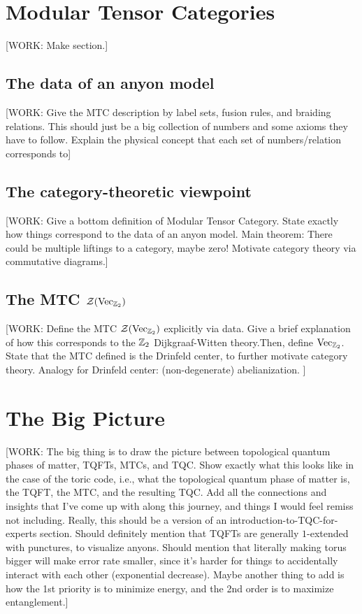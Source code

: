 \documentclass{article}
\theoremstyle{definition}
\numberwithin{figure}{section}
\begin{document}
\section{Modular Tensor Categories}
\label{Modular Tensor Categories}

[WORK: Make section.]
\subsection{The data of an anyon model}
\label{Anyon model}

[WORK: Give the MTC description by label sets, fusion rules, and braiding relations. This should just be a big collection of numbers and some axioms they have to follow. Explain the physical concept that each set of numbers/relation corresponds to]

\subsection{The category-theoretic viewpoint}
\label{Category viewpoint}

[WORK: Give a bottom definition of Modular Tensor Category. State exactly how things correspond to the data of an anyon model. Main theorem: There could be multiple liftings to a category, maybe zero! Motivate category theory via commutative diagrams.]

\subsection{The MTC $\mathcal{Z}(\mathrm{Vec}_{\mathbb{Z}_2})$}
\label{VecZ2 MTC}

[WORK: Define the MTC $\mathcal{Z}(\mathrm{Vec}_{\mathbb{Z}_2})$ explicitly via data. Give a brief explanation of how this corresponds to the $\mathbb{Z}_2$ Dijkgraaf-Witten theory.Then, define $\mathrm{Vec}_{\mathbb{Z}_2}$. State that the MTC defined is the Drinfeld center, to further motivate category theory. Analogy for Drinfeld center: (non-degenerate) abelianization. ]

\section{The Big Picture}
\label{The Big Picture}

[WORK: The big thing is to draw the picture between topological quantum phases of matter, TQFTs, MTCs, and TQC. Show exactly what this looks like in the case of the toric code, i.e., what the topological quantum phase of matter is, the TQFT, the MTC, and the resulting TQC. Add all the connections and insights that I've come up with along this journey, and things I would feel remiss not including. Really, this should be a version of an introduction-to-TQC-for-experts section. Should definitely mention that TQFTs are generally $1$-extended with punctures, to visualize anyons. Should mention that literally making torus bigger will make error rate smaller, since it's harder for things to accidentally interact with each other (exponential decrease). Maybe another thing to add is how the 1st priority is to minimize energy, and the 2nd order is to maximize entanglement.]
\end{document}
